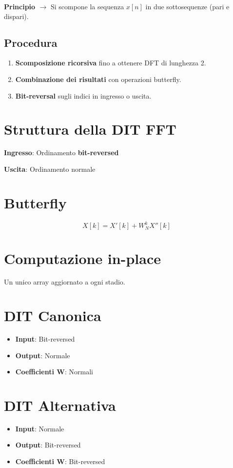 \textbf{Principio $\rightarrow$} Si scompone la sequenza \( x[n] \) in due sottosequenze (pari e dispari).

\subsection*{Procedura}
\begin{enumerate}
    \item \textbf{Scomposizione ricorsiva} fino a ottenere DFT di lunghezza 2.
    \item \textbf{Combinazione dei risultati} con operazioni butterfly.
    \item \textbf{Bit-reversal} sugli indici in ingresso o uscita.
\end{enumerate}

\section*{Struttura della DIT FFT}

\textbf{Ingresso}: Ordinamento \textbf{bit-reversed}

\textbf{Uscita}: Ordinamento normale

\section*{Butterfly}
\[
X[k] = X'[k] + W_N^k X''[k]
\]

\section*{Computazione in-place}
Un unico array aggiornato a ogni stadio.
\section*{DIT Canonica}

\begin{itemize}
    \item \textbf{Input}: Bit-reversed
    \item \textbf{Output}: Normale
    \item \textbf{Coefficienti W}: Normali
\end{itemize}

\section*{DIT Alternativa}

\begin{itemize}
    \item \textbf{Input}: Normale
    \item \textbf{Output}: Bit-reversed
    \item \textbf{Coefficienti W}: Bit-reversed
\end{itemize}

